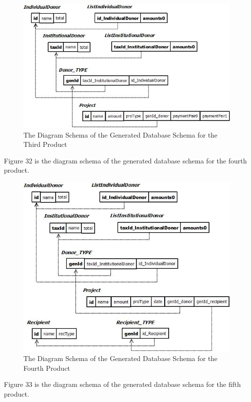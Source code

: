 \documentclass[runningheads,a4paper]{llncs}
\begin{document}
\begin{figure}
	\centering
	\includegraphics[scale=0.6]{Eval3.jpg}
	\caption{The Diagram Schema of the Generated Database Schema for the Third Product}
	\label{Figure 31}
\end{figure}

Figure 32 is the diagram schema of the generated database schema for the fourth product.

\begin{figure}
	\centering
	\includegraphics[scale=0.6]{Eval4.jpg}
	\caption{The Diagram Schema of the Generated Database Schema for the Fourth Product}
	\label{Figure 32}
\end{figure}

Figure 33 is the diagram schema of the generated database schema for the fifth product.
\end{document}

